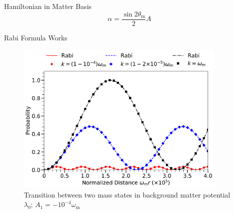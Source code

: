 \documentclass[9pt]{beamer}
\begin{document}
\begin{darkframes}
\begin{frame}{Hamiltonian in Matter Basis}
\begin{equation*}
\alpha = \frac{\sin2\theta_{\mathrm m}}{2}A
\end{equation*}







\end{frame}



\begin{frame}{Rabi Formula Works}



\begin{tcolorbox}[colback=white]
\begin{figure}
\includegraphics[width=0.9\textwidth]{assets/rabiOscillationsNeutrinoCoincidence-single-frequency-with-legend}
\caption*{
\color{black}Transition between two mass states in background matter potential $\lambda_0$; $A_1 = -10^{-4}\omega_{\mathrm m}$
}
\end{figure}
\end{tcolorbox}


\end{frame}
\end{darkframes}
\end{document}
